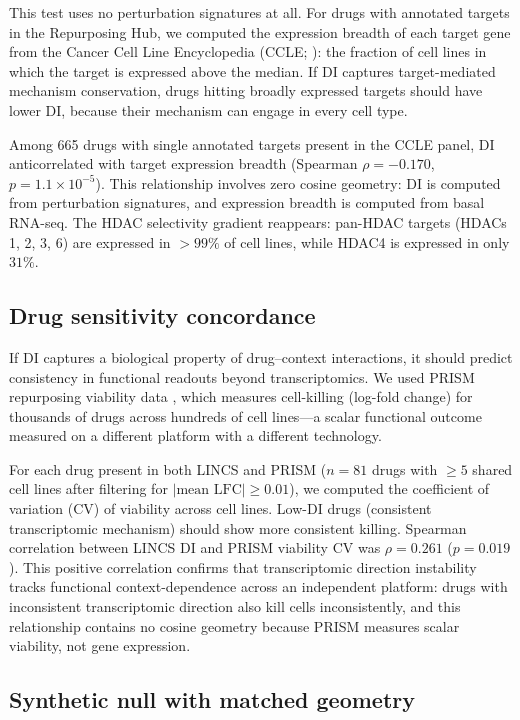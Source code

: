 \documentclass[11pt]{article}
\begin{document}
This test uses no perturbation signatures at all.  For drugs with
annotated targets in the Repurposing Hub, we computed the expression
breadth of each target gene from the Cancer Cell Line Encyclopedia
(CCLE; \citealt{barretina2012cancer}): the fraction of cell lines in
which the target is expressed above the median.  If DI captures
target-mediated mechanism conservation, drugs hitting broadly expressed
targets should have lower DI, because their mechanism can engage in
every cell type.

Among 665 drugs with single annotated targets present
in the CCLE panel, DI anticorrelated with target expression breadth
(Spearman $\rho = -0.170$,
$p = 1.1 \times 10^{-5}$).  This relationship involves
zero cosine geometry: DI is computed from perturbation signatures, and
expression breadth is computed from basal RNA-seq.  The HDAC selectivity
gradient reappears: pan-HDAC targets (HDACs 1, 2, 3, 6) are expressed
in $>99\%$ of cell lines, while HDAC4
is expressed in only $31\%$.

\subsection{Drug sensitivity concordance}

If DI captures a biological property of drug--context interactions,
it should predict consistency in functional readouts beyond
transcriptomics.  We used PRISM repurposing viability data
\citep{corsello2020discovering}, which measures cell-killing (log-fold
change) for thousands of drugs across hundreds of cell lines---a
scalar functional outcome measured on a different platform with a
different technology.

For each drug present in both LINCS and PRISM
($n = 81$ drugs with $\geq 5$ shared
cell lines after filtering for $|\text{mean LFC}| \geq 0.01$), we
computed the coefficient of variation (CV) of viability across cell
lines.  Low-DI drugs (consistent transcriptomic mechanism) should
show more consistent killing.  Spearman correlation between LINCS DI
and PRISM viability CV was
$\rho = 0.261$
($p = 0.019$).  This positive correlation
confirms that transcriptomic direction instability tracks functional
context-dependence across an independent platform: drugs with
inconsistent transcriptomic direction also kill cells inconsistently,
and this relationship contains no cosine geometry because PRISM
measures scalar viability, not gene expression.

\subsection{Synthetic null with matched geometry}
\end{document}
